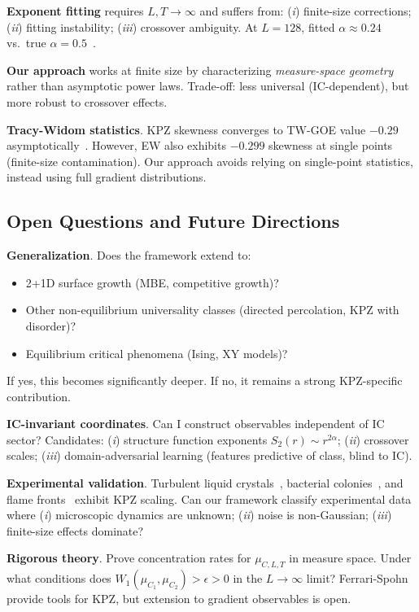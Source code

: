 \documentclass[aps,pre,reprint,amsmath,amssymb,superscriptaddress]{revtex4-2}
\begin{document}
\textbf{Exponent fitting} requires $L, T \to \infty$ and suffers from: (\textit{i}) finite-size corrections; (\textit{ii}) fitting instability; (\textit{iii}) crossover ambiguity. At $L=128$, fitted $\alpha \approx 0.24$ vs.~true $\alpha = 0.5$~\cite{Bentley2026}.

\textbf{Our approach} works at finite size by characterizing \textit{measure-space geometry} rather than asymptotic power laws. Trade-off: less universal (IC-dependent), but more robust to crossover effects.

\textbf{Tracy-Widom statistics}. KPZ skewness converges to TW-GOE value $-0.29$ asymptotically~\cite{Sasamoto2010}. However, EW also exhibits $-0.299$ skewness at single points (finite-size contamination). Our approach avoids relying on single-point statistics, instead using full gradient distributions.

\subsection{Open Questions and Future Directions}

\textbf{Generalization}. Does the framework extend to:
\begin{itemize}
\item 2+1D surface growth (MBE, competitive growth)?
\item Other non-equilibrium universality classes (directed percolation, KPZ with disorder)?
\item Equilibrium critical phenomena (Ising, XY models)?
\end{itemize}
If yes, this becomes significantly deeper. If no, it remains a strong KPZ-specific contribution.

\textbf{IC-invariant coordinates}. Can I construct observables independent of IC sector? Candidates: (\textit{i}) structure function exponents $S_2(r) \sim r^{2\alpha}$; (\textit{ii}) crossover scales; (\textit{iii}) domain-adversarial learning (features predictive of class, blind to IC).

\textbf{Experimental validation}. Turbulent liquid crystals~\cite{Takeuchi2010}, bacterial colonies~\cite{Halpin-Healy2015}, and flame fronts~\cite{Myllys2001} exhibit KPZ scaling. Can our framework classify experimental data where (\textit{i}) microscopic dynamics are unknown; (\textit{ii}) noise is non-Gaussian; (\textit{iii}) finite-size effects dominate?

\textbf{Rigorous theory}. Prove concentration rates for $\mu_{C,L,T}$ in measure space. Under what conditions does $W_1(\mu_{C_1}, \mu_{C_2}) > \epsilon > 0$ in the $L \to \infty$ limit? Ferrari-Spohn~\cite{Ferrari2011} provide tools for KPZ, but extension to gradient observables is open.
\end{document}
